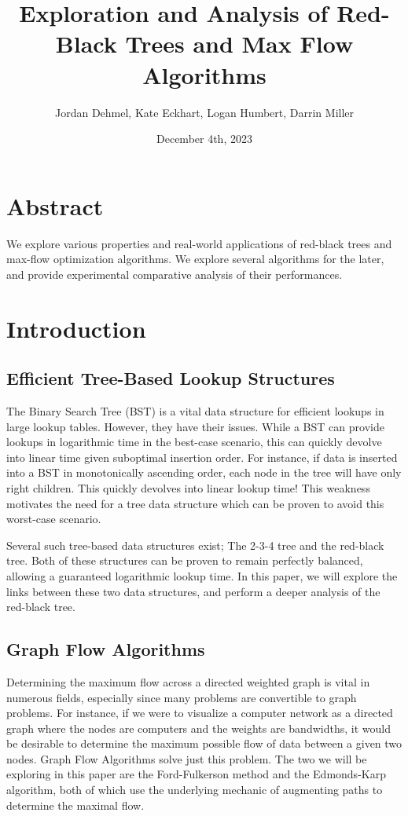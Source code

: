 \documentclass[12pt]{amsart}
\title{Exploration and Analysis of Red-Black Trees and Max Flow
    Algorithms}
\author{Jordan Dehmel, Kate Eckhart, Logan Humbert, Darrin Miller}
\date{December 4th, 2023}
\begin{document}
\maketitle

\tableofcontents

\section{Abstract}

    We explore various properties and real-world applications of
    red-black trees and max-flow optimization algorithms. We
    explore several algorithms for the later, and provide
    experimental comparative analysis of their performances.

\newpage
\section{Introduction}

\subsection{Efficient Tree-Based Lookup Structures}

    The Binary Search Tree (BST) is a vital data structure for
    efficient lookups in large lookup tables. However, they have
    their issues. While a BST can provide lookups in logarithmic
    time in the best-case scenario, this can quickly devolve
    into linear time given suboptimal insertion order. For
    instance, if data is inserted into a BST in monotonically
    ascending order, each node in the tree will have only right
    children. This quickly devolves into linear lookup time!
    This weakness motivates the need for a tree data structure
    which can be proven to avoid this worst-case scenario.

    Several such tree-based data structures exist; The 2-3-4
    tree and the red-black tree. Both of these structures can
    be proven to remain perfectly balanced, allowing a
    guaranteed logarithmic lookup time. In this paper, we will
    explore the links between these two data structures, and
    perform a deeper analysis of the red-black tree.

\subsection{Graph Flow Algorithms}

    Determining the maximum flow across a directed weighted
    graph is vital in numerous fields, especially since many
    problems are convertible to graph problems. For instance, if
    we were to visualize a computer network as a directed graph
    where the nodes are computers and the weights are
    bandwidths, it would be desirable to determine the maximum
    possible flow of data between a given two nodes. Graph Flow
    Algorithms solve just this problem. The two we will be
    exploring in this paper are the Ford-Fulkerson method and
    the Edmonds-Karp algorithm, both of which use the underlying
    mechanic of augmenting paths to determine the maximal flow.
\end{document}
